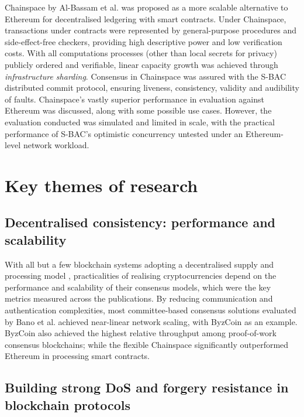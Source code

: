 \documentclass[11pt]{article}
\begin{document}
Chainspace by Al-Bassam et al. \cite{al2017chainspace} was proposed as a more scalable alternative to Ethereum \cite{wood2014ethereum} for decentralised ledgering with smart contracts. Under Chainspace, transactions under contracts were represented by general-purpose procedures and side-effect-free checkers, providing high descriptive power and low verification costs. With all computations processes (other than local secrets for privacy) publicly ordered and verifiable, linear capacity growth was achieved through \emph{infrastructure sharding}. Consensus in Chainspace was assured with the S-BAC distributed commit protocol, ensuring liveness, consistency, validity and audibility of faults. Chainspace's vastly superior performance in evaluation against Ethereum was discussed, along with some possible use cases. However, the evaluation conducted was simulated and limited in scale, with the practical performance of S-BAC's optimistic concurrency untested under an Ethereum-level network workload. 

\section{Key themes of research}

\subsection{Decentralised consistency: performance and scalability}

With all but a few blockchain systems adopting a decentralised supply and processing model \cite[VIII. A.]{bano2017consensus}, practicalities of realising cryptocurrencies depend on the performance and scalability of their consensus models, which were the key metrics measured across the publications. By reducing communication and authentication complexities, most committee-based consensus solutions evaluated by Bano et al. \cite{bano2017consensus} achieved near-linear network scaling, with ByzCoin \cite{kogias2016enhancing} as an example. ByzCoin also achieved \cite[4.3]{kogias2016enhancing} the highest relative throughput among proof-of-work consensus blockchains; while the flexible Chainspace \cite[Sec. VII]{al2017chainspace} significantly outperformed Ethereum in processing smart contracts.

\subsection{Building strong DoS and forgery resistance in blockchain protocols}
\end{document}
